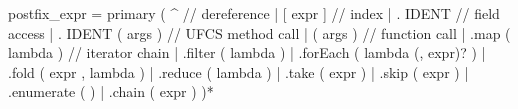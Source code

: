 \documentclass[
  11pt,
]{article}
\newenvironment{Shaded}{}{}
\newcommand{\NormalTok}[1]{#1}
\begin{document}
\begin{Shaded}
\begin{Highlighting}[]
\NormalTok{postfix\_expr   = primary}
\NormalTok{                 ( \textquotesingle{}\^{}\textquotesingle{}                              // dereference}
\NormalTok{                 | \textquotesingle{}[\textquotesingle{} expr \textquotesingle{}]\textquotesingle{}                    // index}
\NormalTok{                 | \textquotesingle{}.\textquotesingle{} IDENT                       // field access}
\NormalTok{                 | \textquotesingle{}.\textquotesingle{} IDENT \textquotesingle{}(\textquotesingle{} args \textquotesingle{})\textquotesingle{}          // UFCS method call}
\NormalTok{                 | \textquotesingle{}(\textquotesingle{} args \textquotesingle{})\textquotesingle{}                    // function call}
\NormalTok{                 | \textquotesingle{}.map\textquotesingle{} \textquotesingle{}(\textquotesingle{} lambda \textquotesingle{})\textquotesingle{}           // iterator chain}
\NormalTok{                 | \textquotesingle{}.filter\textquotesingle{} \textquotesingle{}(\textquotesingle{} lambda \textquotesingle{})\textquotesingle{}}
\NormalTok{                 | \textquotesingle{}.forEach\textquotesingle{} \textquotesingle{}(\textquotesingle{} lambda (\textquotesingle{},\textquotesingle{} expr)? \textquotesingle{})\textquotesingle{}}
\NormalTok{                 | \textquotesingle{}.fold\textquotesingle{} \textquotesingle{}(\textquotesingle{} expr \textquotesingle{},\textquotesingle{} lambda \textquotesingle{})\textquotesingle{}}
\NormalTok{                 | \textquotesingle{}.reduce\textquotesingle{} \textquotesingle{}(\textquotesingle{} lambda \textquotesingle{})\textquotesingle{}}
\NormalTok{                 | \textquotesingle{}.take\textquotesingle{} \textquotesingle{}(\textquotesingle{} expr \textquotesingle{})\textquotesingle{}}
\NormalTok{                 | \textquotesingle{}.skip\textquotesingle{} \textquotesingle{}(\textquotesingle{} expr \textquotesingle{})\textquotesingle{}}
\NormalTok{                 | \textquotesingle{}.enumerate\textquotesingle{} \textquotesingle{}(\textquotesingle{} \textquotesingle{})\textquotesingle{}}
\NormalTok{                 | \textquotesingle{}.chain\textquotesingle{} \textquotesingle{}(\textquotesingle{} expr \textquotesingle{})\textquotesingle{}}
\NormalTok{                 )*}


\end{Highlighting}
\end{Shaded}
\end{document}

